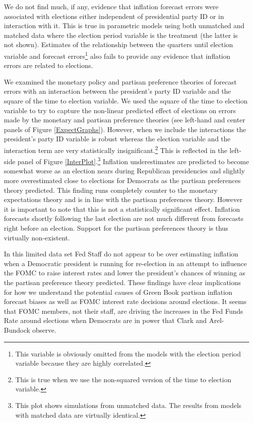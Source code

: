 \documentclass[a4paper]{article}\usepackage{graphicx, color}
\begin{document}
We do not find much, if any, evidence that inflation forecast errors were associated with elections either independent of presidential party ID or in interaction with it. This is true in parametric models using both unmatched and matched data where the election period variable is the treatment (the latter is not shown). Estimates of the relationship between the quarters until election variable and forecast errors\footnote{This variable is obviously omitted from the models with the election period variable because they are highly correlated.} also fails to provide any evidence that inflation errors are related to elections. 

We examined the monetary policy and partisan preference theories of forecast errors with an interaction between the president's party ID variable and the square of the time to election variable. We used the square of the time to election variable to try to capture the non-linear predicted effect of elections on errors made by the monetary and partisan preference theories (see left-hand and center panels of Figure \ref{ExpectGraphs}). However, when we include the interactions the president's party ID variable is robust whereas the election variable and the interaction term are very statistically insignificant.\footnote{This is true when we use the non-squared version of the time to election variable.} This is reflected in the left-side panel of Figure \ref{InterPlot}.\footnote{This plot shows simulations from unmatched data. The results from models with matched data are virtually identical.} Inflation underestimates are predicted to become somewhat worse as an election nears during Republican presidencies and slightly more overestimated close to elections for Democrats as the partisan preferences theory predicted. This finding runs completely counter to the monetary expectations theory and is in line with the partisan preferences theory. However it is important to note that this is not a statistically significant effect. Inflation forecasts shortly following the last election are not much different from forecasts right before an election. Support for the partisan preferences theory is thus virtually non-existent.

In this limited data set Fed Staff do not appear to be over estimating inflation when a Democratic president is running for re-election in an attempt to influence the FOMC to raise interest rates and lower the president's chances of winning as the partisan preference theory predicted. These findings have clear implications for how we understand the potential causes of Green Book partisan inflation forecast biases as well as FOMC interest rate decisions around elections. It seems that FOMC members, not their staff, are driving the increases in the Fed Funds Rate around elections when Democrats are in power that Clark and Arel-Bundock observe. 
\end{document}
